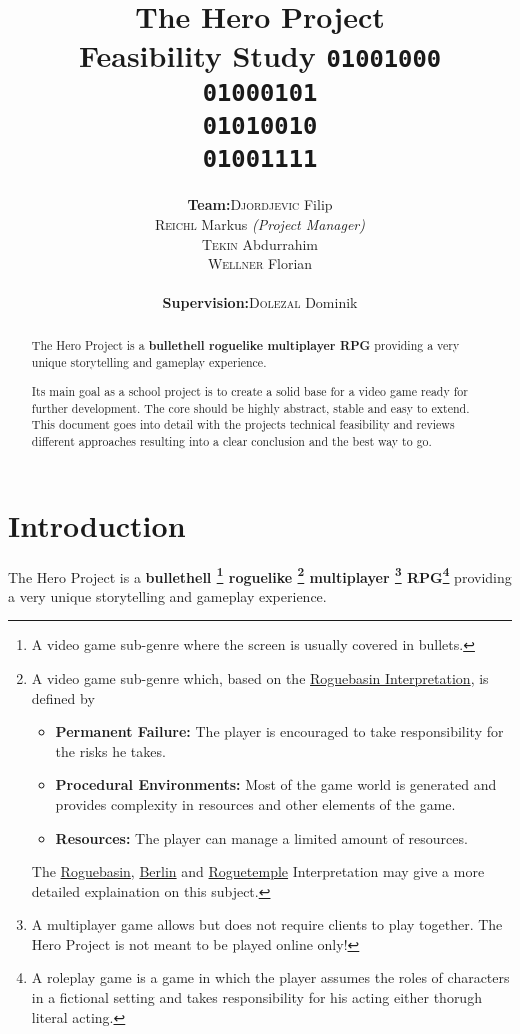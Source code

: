 \documentclass[11pt]{article}
\title{
  \textbf{The Hero Project}\\
  \large{Feasibility Study}
  \linebreak
  \linebreak
  \small{\texttt{01001000\\01000101\\01010010\\01001111}}
}
\author{
  \begin{tabular}{rl}
    \textbf{Team:}
    & \textsc{Djordjevic} Filip\\
    & \textsc{Reichl} Markus \small{\textit{(Project Manager)}}\\
    & \textsc{Tekin} Abdurrahim\\
    & \textsc{Wellner} Florian\\
    \\
    \textbf{Supervision:}
    & \textsc{Dolezal} Dominik
  \end{tabular}
}
\begin{document}
\begin{titlepage}
  \clearpage
  \maketitle
  \thispagestyle{empty}
  
  \begin{abstract}
    \begin{flushleft}
      The Hero Project is a \textbf{bullethell roguelike multiplayer RPG} providing a very unique storytelling and gameplay experience.
      
      Its main goal as a school project is to create a solid base for a video game ready for further development. The core should be highly abstract, stable and easy to extend.
      \linebreak
      \linebreak
      This document goes into detail with the projects technical feasibility and reviews different approaches resulting into a clear conclusion and the best way to go.
     \end{flushleft}
  \end{abstract}
\end{titlepage}

\tableofcontents
\newpage

\section{Introduction}
The Hero Project is a \textbf{
  bullethell
  \footnote{A video game sub-genre where the screen is usually covered in bullets.}
  roguelike
  \footnote{A video game sub-genre which, based on the \href{http://roguebasin.com/roguelike-definition}{Roguebasin Interpretation}, is defined by 
    \begin{itemize}
      \item \textbf{Permanent Failure:} The player is encouraged to take responsibility for the risks he takes.
      \item \textbf{Procedural Environments:} Most of the game world is generated and provides complexity in resources and other elements of the game.
      \item \textbf{Resources:} The player can manage a limited amount of resources.
    \end{itemize}
    The \href{http://roguebasin.com/roguelike-definition}{Roguebasin}, \href{http://roguebasin.com/index.php?title=Berlin_Interpretation}{Berlin} and \href{http://roguetemple.com/roguelike-definition}{Roguetemple} Interpretation may give a more detailed explaination on this subject.
  }
  multiplayer
  \footnote{A multiplayer game allows but does not require clients to play together. The Hero Project is not meant to be played online only!}
  RPG\footnote{A roleplay game is a game in which the player assumes the roles of characters in a fictional setting and takes responsibility for his acting either thorugh literal acting.}
} providing a very unique storytelling and gameplay experience.
\end{document}
